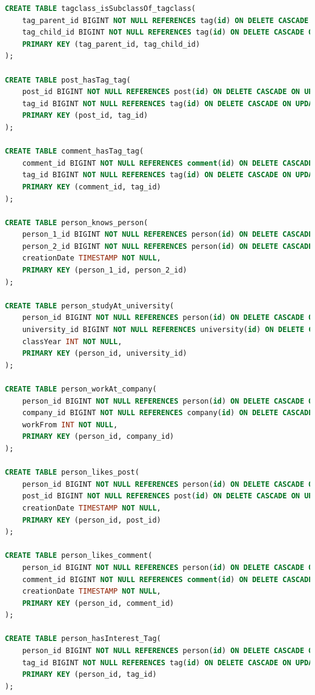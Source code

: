 \begin{lstlisting}[language=sql]
CREATE TABLE tagclass_isSubclassOf_tagclass(
    tag_parent_id BIGINT NOT NULL REFERENCES tag(id) ON DELETE CASCADE ON UPDATE CASCADE,
    tag_child_id BIGINT NOT NULL REFERENCES tag(id) ON DELETE CASCADE ON UPDATE CASCADE,
    PRIMARY KEY (tag_parent_id, tag_child_id)
);

CREATE TABLE post_hasTag_tag(
    post_id BIGINT NOT NULL REFERENCES post(id) ON DELETE CASCADE ON UPDATE CASCADE,
    tag_id BIGINT NOT NULL REFERENCES tag(id) ON DELETE CASCADE ON UPDATE CASCADE,
    PRIMARY KEY (post_id, tag_id)
);

CREATE TABLE comment_hasTag_tag(
    comment_id BIGINT NOT NULL REFERENCES comment(id) ON DELETE CASCADE ON UPDATE CASCADE,
    tag_id BIGINT NOT NULL REFERENCES tag(id) ON DELETE CASCADE ON UPDATE CASCADE,
    PRIMARY KEY (comment_id, tag_id)
);

CREATE TABLE person_knows_person(
    person_1_id BIGINT NOT NULL REFERENCES person(id) ON DELETE CASCADE ON UPDATE CASCADE,
    person_2_id BIGINT NOT NULL REFERENCES person(id) ON DELETE CASCADE ON UPDATE CASCADE,
    creationDate TIMESTAMP NOT NULL,
    PRIMARY KEY (person_1_id, person_2_id)
);

CREATE TABLE person_studyAt_university(
    person_id BIGINT NOT NULL REFERENCES person(id) ON DELETE CASCADE ON UPDATE CASCADE,
    university_id BIGINT NOT NULL REFERENCES university(id) ON DELETE CASCADE ON UPDATE CASCADE,
    classYear INT NOT NULL,
    PRIMARY KEY (person_id, university_id)
);

CREATE TABLE person_workAt_company(
    person_id BIGINT NOT NULL REFERENCES person(id) ON DELETE CASCADE ON UPDATE CASCADE,
    company_id BIGINT NOT NULL REFERENCES company(id) ON DELETE CASCADE ON UPDATE CASCADE,
    workFrom INT NOT NULL,
    PRIMARY KEY (person_id, company_id)
);

CREATE TABLE person_likes_post(
    person_id BIGINT NOT NULL REFERENCES person(id) ON DELETE CASCADE ON UPDATE CASCADE,
    post_id BIGINT NOT NULL REFERENCES post(id) ON DELETE CASCADE ON UPDATE CASCADE,
    creationDate TIMESTAMP NOT NULL,
    PRIMARY KEY (person_id, post_id)
);

CREATE TABLE person_likes_comment(
    person_id BIGINT NOT NULL REFERENCES person(id) ON DELETE CASCADE ON UPDATE CASCADE,
    comment_id BIGINT NOT NULL REFERENCES comment(id) ON DELETE CASCADE ON UPDATE CASCADE,
    creationDate TIMESTAMP NOT NULL,
    PRIMARY KEY (person_id, comment_id)
);

CREATE TABLE person_hasInterest_Tag(
    person_id BIGINT NOT NULL REFERENCES person(id) ON DELETE CASCADE ON UPDATE CASCADE,
    tag_id BIGINT NOT NULL REFERENCES tag(id) ON DELETE CASCADE ON UPDATE CASCADE,
    PRIMARY KEY (person_id, tag_id)
);
\end{lstlisting}

